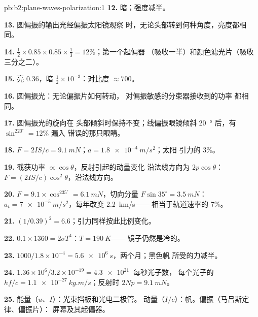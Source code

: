 \begin{solution}{pb:b2:plane-waves-polarization:1}
\textbf{12.} 暗；强度减半。

\textbf{13.} 圆偏振的输出光经偏振太阳镜观察
时，无论头部转到何种角度，亮度都相同。

\textbf{14.} $\tfrac12 \times 0.85 \times 0.85 \times \tfrac13 = 12\%$；第一个起偏器
（吸收一半）和颜色滤光片（吸收三分之二）。

\textbf{15.} 亮 $0.36$，暗 $\tfrac12 \times 10^{-3}$：对比度 $\approx 700$。

\textbf{16.} 圆偏振光：无论偏振片如何转动，
对偏振敏感的分束器接收到的功率
都相同。

\textbf{17.} 圆偏振光的旋向在
头部倾斜时保持不变；线偏振眼镜倾斜 \qty{20}{\degree} 后，有 $\sin^220^\circ = 12\%$ 漏入
错误的那只眼睛。

\textbf{18.} $F = 2IS/c = \qty{9.1}{mN}$；$a = \qty{1.8e-4}{m/s^2}$；太阳
引力的 $3\%$。

\textbf{19.} 截获功率 $\propto\cos\theta$，反射引起的动量变化
沿法线方向为 $2p\cos\theta$：$F = (2IS/c)\cos^2\theta$，沿法线方向。

\textbf{20.} $F = 9.1 \times \cos^235^\circ = \qty{6.1}{mN}$，切向分量 $F\sin35^\circ
= \qty{3.5}{mN}$：$a_t = \qty{7e-5}{m/s^2}$，每年改变 \qty{2.2}{km/s}——
相当于轨道速率的 $7\%$。

\textbf{21.} $(1/0.39)^2 = 6.6$；引力同样按此比例变化。

\textbf{22.} $0.1 \times 1360 = 2\sigma T^4$：$T = \qty{190}{K}$——
镜子仍然是冷的。

\textbf{23.} $1000/1.8 \times 10^{-4} = \qty{5.6e6}{s}$，两个月；黑色帆
所受的力减半。

\textbf{24.} $1.36 \times 10^6/3.2 \times 10^{-19} = \qty{4.3e21}{}$ 每秒光子数，
每个光子的 $hf/c = \qty{1.1e-27}{kg.m/s}$；反射时 $2Np = \qty{9.1}{mN}$。

\textbf{25.} 能量（$u$、$I$）：光束挡板和光电二极管。
动量（$I/c$）：帆。偏振（马吕斯定律、偏振片）：
屏幕及其起偏器。
\end{solution}
